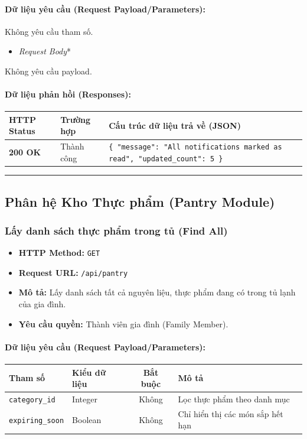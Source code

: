 \documentclass[12pt,a4paper]{article}
\begin{document}
\paragraph{Dữ liệu yêu cầu (Request Payload/Parameters):}
Không yêu cầu tham số.
\begin{itemize}[leftmargin=*]
    \item \textit{Request Body}*
\end{itemize}

Không yêu cầu payload.

\paragraph{Dữ liệu phản hồi (Responses):}
\begin{longtable}{|>{\raggedright\arraybackslash}p{2.8cm}|>{\raggedright\arraybackslash}p{3.2cm}|>{\raggedright\arraybackslash}p{8.0cm}|}
\hline
\textbf{HTTP Status} & \textbf{Trường hợp} & \textbf{Cấu trúc dữ liệu trả về (JSON)} \\ \hline
\endhead
\textbf{200 OK} & Thành công & \texttt{\{ "message": "All notifications marked as read", "updated\_count": 5 \}} \\ \hline
\end{longtable}

\vskip 0.4cm
\noindent\rule{\textwidth}{0.3pt}
\vskip 0.4cm

\subsection{Phân hệ Kho Thực phẩm (Pantry Module)}

\subsubsection{Lấy danh sách thực phẩm trong tủ (Find All)}
\begin{itemize}[leftmargin=*]
    \item \textbf{HTTP Method:} \texttt{GET}
    \item \textbf{Request URL:} \texttt{/api/pantry}
    \item \textbf{Mô tả:} Lấy danh sách tất cả nguyên liệu, thực phẩm đang có trong tủ lạnh của gia đình.
    \item \textbf{Yêu cầu quyền:} Thành viên gia đình (Family Member).
\end{itemize}

\paragraph{Dữ liệu yêu cầu (Request Payload/Parameters):}
\begin{longtable}{|>{\raggedright\arraybackslash}p{2.8cm}|>{\raggedright\arraybackslash}p{2.2cm}|c|>{\raggedright\arraybackslash}p{7.0cm}|}
\hline
\textbf{Tham số} & \textbf{Kiểu dữ liệu} & \textbf{Bắt buộc} & \textbf{Mô tả} \\ \hline
\endhead
\texttt{category\_id} & Integer & Không & Lọc thực phẩm theo danh mục \\ \hline
\texttt{expiring\_soon} & Boolean & Không & Chỉ hiển thị các món sắp hết hạn \\ \hline
\end{longtable}
\end{document}
